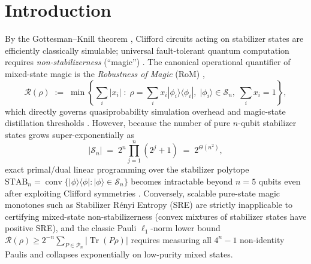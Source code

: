 \documentclass[11pt,a4paper]{article}
\theoremstyle{definition}
\theoremstyle{remark}
\newcommand{\Q}{\mathbb{Q}}
\newcommand{\STAB}{\mathrm{STAB}}
\newcommand{\RoM}{\mathcal{R}}
\newcommand{\Pauli}{\mathcal{P}}
\newcommand{\Tr}{\operatorname{Tr}}
\newcommand{\Code}[1]{{\small\texttt{#1}}}
\begin{document}
\begin{abstract}
$F_\ell \preceq +I$ on all quantum states, Tiers~1--2 strictly dominate non-CG-rounded Tier~3 whenever individual Pauli expectations can be re-weighted into sub-witnesses, whereas Tier~3 strictly lowers the stabilizer ceiling $\hat{\beta}_+(W)$ of fixed signed witnesses below every unsigned graph invariant. All 16 core theorems are mechanized in zero-dependency Lean~4 (\Code{v4.35.0}, \textbf{0~\Code{sorry}}, \textbf{0~\Code{Classical.choice}}), and our exact-$\Q$ verifier validates 9/9 published certificates ($n = 1\dots 32$) while rejecting 28/28 live adversarial forgery, canonical-parser, and type-injection attacks.
\end{abstract}

\section{Introduction}
\label{sec:intro}

By the Gottesman--Knill theorem \cite{AaronsonGottesman2004}, Clifford circuits acting on stabilizer states are efficiently classically simulable; universal fault-tolerant quantum computation requires \emph{non-stabilizerness} (``magic'') \cite{BravyiKitaev2005,Veitch2014Resource}. The canonical operational quantifier of mixed-state magic is the \emph{Robustness of Magic} (RoM) \cite{HowardCampbell2017},
\begin{equation}
  \RoM(\rho) \;:=\; \min\left\{\sum_i |x_i| \;:\; \rho = \sum_i x_i |\phi_i\rangle\langle\phi_i|,\; |\phi_i\rangle \in \mathcal{S}_n,\; \sum_i x_i = 1\right\},
  \label{eq:rom-def}
\end{equation}
which directly governs quasiprobability simulation overhead and magic-state distillation thresholds \cite{HowardCampbell2017,SeddonCampbell2019}. However, because the number of pure $n$-qubit stabilizer states grows super-exponentially as
\begin{equation}
  |\mathcal{S}_n| \;=\; 2^n \prod_{j=1}^n (2^j + 1) \;=\; 2^{\Theta(n^2)},
  \label{eq:stab-count}
\end{equation}
exact primal/dual linear programming over the stabilizer polytope $\STAB_n = \operatorname{conv}\{|\phi\rangle\langle\phi| : |\phi\rangle \in \mathcal{S}_n\}$ becomes intractable beyond $n = 5$ qubits even after exploiting Clifford symmetries \cite{HeinrichGross2019}. Conversely, scalable pure-state magic monotones such as Stabilizer R\'enyi Entropy (SRE) \cite{Leone2022SRE} are strictly inapplicable to certifying mixed-state non-stabilizerness (convex mixtures of stabilizer states have positive SRE), and the classic Pauli $\ell_1$-norm lower bound $\RoM(\rho) \ge 2^{-n} \sum_{P \in \Pauli_n} |\Tr(P\rho)|$ \cite{HowardCampbell2017} requires measuring all $4^n - 1$ non-identity Paulis and collapses exponentially on low-purity mixed states.
\end{document}
